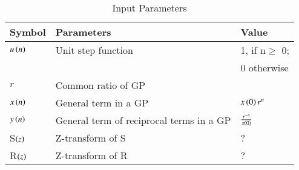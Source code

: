 \setlength{\arrayrulewidth}{0.2mm}
\setlength{\tabcolsep}{15pt}
\renewcommand{\arraystretch}{1.15}


\begin{table}[ht]
  \centering
  \begin{tabular}{|p{1cm}|p{2cm}|p{2cm}|}
    \hline
    	Symbol & Parameters & Value\\
    \hline
	  $u\left(n\right)$ & Unit step function & 1, if n$\geq$ 0; \\& &0 otherwise \\
    \hline
	  $r$ & Common ratio of GP &  \\	  
    \hline
	  $x\left(n\right)$ & General term in a GP & $x\left(0\right) r^{n}$ \\
    \hline
	  $y\left(n\right)$ & General term of reciprocal terms in a GP & $\frac{r^{-n}}{x\left(0\right)}$ \\
    \hline
	  S$\left(z\right)$ & Z-transform of S &  ? \\
    \hline
	  R$\left(z\right)$ & Z-transform of R & ? \\ 
    \hline
  \end{tabular}
  \vspace{0.3cm}
  \caption{Input Parameters}
  \label{tab:24.11.9.5.14}
\end{table}
